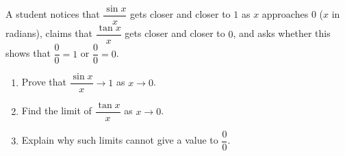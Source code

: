 A student notices that $\dfrac{\sin x}{x}$ gets closer and closer to $1$ as $x$ approaches $0$ ($x$ in radians), claims that $\dfrac{\tan x}{x}$ gets closer and closer to $0$, and asks whether this shows that $\dfrac00=1$ or $\dfrac00=0$.
\begin{enumerate}
\item[(a)] Prove that $\dfrac{\sin x}{x}\to1$ as $x\to0$.
\item[(b)] Find the limit of $\dfrac{\tan x}{x}$ as $x\to0$.
\item[(c)] Explain why such limits cannot give a value to $\dfrac00$.
\end{enumerate}
